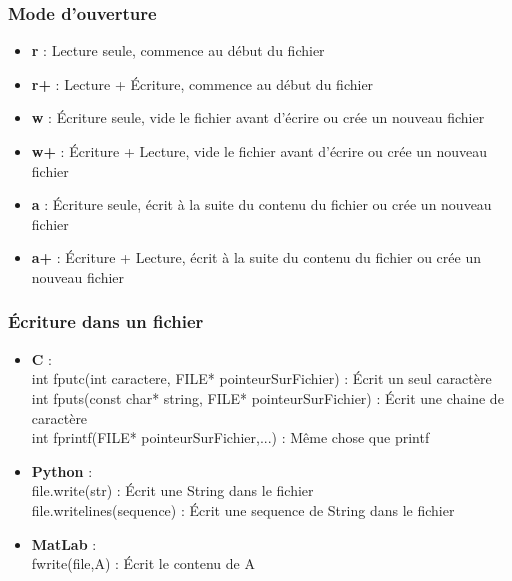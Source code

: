 \documentclass{beamer}
\begin{document}
	\begin{frame}
	\frametitle{Mode d'ouverture}
		\begin{itemize}
			\item {\bfseries r} : Lecture seule, commence au début du fichier
			\item {\bfseries r+} : Lecture + Écriture, commence au début du fichier
			\item {\bfseries w} : Écriture seule, vide le fichier avant d'écrire ou crée un nouveau fichier
			\item {\bfseries w+} : Écriture + Lecture, vide le fichier avant d'écrire ou crée un nouveau fichier
			\item {\bfseries a} : Écriture seule, écrit à la suite du contenu du fichier ou crée un nouveau fichier
			\item {\bfseries a+} : Écriture + Lecture, écrit à la suite du contenu du fichier ou crée un nouveau fichier
		\end{itemize}
	\end{frame}

	\begin{frame}
	\frametitle{Écriture dans un fichier}
		\begin{itemize}
			\item  {\bfseries C} : \\
			int fputc(int caractere, FILE* pointeurSurFichier) : Écrit un seul caractère \\
			int fputs(const char* string, FILE* pointeurSurFichier) : Écrit une chaine de caractère \\
			int fprintf(FILE* pointeurSurFichier,...) : Même chose que printf
			\item  {\bfseries Python} : \\
			file.write(str) : Écrit une String dans le fichier\\
			file.writelines(sequence) : Écrit une sequence de String dans le fichier
			\item  {\bfseries MatLab} : \\
			fwrite(file,A) : Écrit le contenu de A
		\end{itemize}
	\end{frame}
\end{document}
